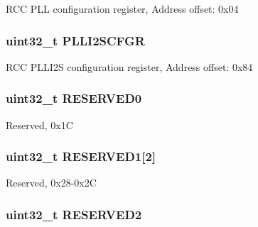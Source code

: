 R\-C\-C P\-L\-L configuration register, Address offset\-: 0x04 \hypertarget{struct_r_c_c___type_def_a2d08d5f995ed77228eb56741184a1bb6}{
\subsubsection[{P\-L\-L\-I2\-S\-C\-F\-G\-R}]{ uint32\-\_\-t P\-L\-L\-I2\-S\-C\-F\-G\-R}}\label{struct_r_c_c___type_def_a2d08d5f995ed77228eb56741184a1bb6}
R\-C\-C P\-L\-L\-I2\-S configuration register, Address offset\-: 0x84 \hypertarget{struct_r_c_c___type_def_af86c61a5d38a4fc9cef942a12744486b}{
\subsubsection[{R\-E\-S\-E\-R\-V\-E\-D0}]{\setlength{\rightskip}{0pt plus 5cm}uint32\-\_\-t R\-E\-S\-E\-R\-V\-E\-D0}}\label{struct_r_c_c___type_def_af86c61a5d38a4fc9cef942a12744486b}
Reserved, 0x1\-C \hypertarget{struct_r_c_c___type_def_a28d88d9a08aab1adbebea61c42ef901e}{
\subsubsection[{R\-E\-S\-E\-R\-V\-E\-D1}]{\setlength{\rightskip}{0pt plus 5cm}uint32\-\_\-t R\-E\-S\-E\-R\-V\-E\-D1\mbox{[}2\mbox{]}}}\label{struct_r_c_c___type_def_a28d88d9a08aab1adbebea61c42ef901e}
Reserved, 0x28-\/0x2\-C \hypertarget{struct_r_c_c___type_def_a4c9b972a304c0e08ca27cbe57627c496}{
\subsubsection[{R\-E\-S\-E\-R\-V\-E\-D2}]{\setlength{\rightskip}{0pt plus 5cm}uint32\-\_\-t R\-E\-S\-E\-R\-V\-E\-D2}}\label{struct_r_c_c___type_def_a4c9b972a304c0e08ca27cbe57627c496}
